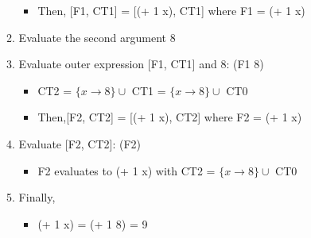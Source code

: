 \documentclass[8pt, letterpaper, titlepage]{article}
\begin{document}
\begin{enumerate}[label=(\alph*)]
\begin{enumerate}[label=(\roman*)]
\begin{itemize}
        \item Then, [F1, CT1] = [(+ 1 x), CT1] where F1 = (+ 1 x)
      \end{itemize}
      \item Evaluate the second argument 8
      \item Evaluate outer expression [F1, CT1] and 8: (F1 8)
      \begin{itemize}
        \item CT2 = $\{x \rightarrow 8\} \cup $ CT1 = $\{x \rightarrow 8\} \cup $ CT0 
        \item Then,[F2, CT2] = [(+ 1 x), CT2] where F2 = (+ 1 x)
      \end{itemize}
      \item Evaluate [F2, CT2]: (F2)
      \begin{itemize}
        \item F2 evaluates to (+ 1 x) with CT2 = $\{x \rightarrow 8\} \cup $ CT0
      \end{itemize}
      \item Finally, 
      \begin{itemize}
        \item (+ 1 x) = (+ 1 8) = 9
      \end{itemize}
    \end{enumerate}
\end{enumerate}
\end{document}
